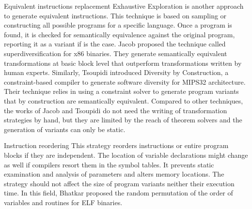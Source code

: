 \begin{strategy}{Equivalent instructions replacement}
    Exhaustive Exploration is another approach to generate equivalent instructions. This technique is based on sampling or constructing all possible programs for a specific language. Once a program is found, it is checked for semantically equivalence against the original program, reporting it as a variant if is the case.
     Jacob \etal \cite{jacob2008superdiversifier} proposed the technique called superdiversification for x86 binaries. They generate semantically equivalent transformations at basic block level that outperform transformations written by human experts. Similarly, Tsoupidi \etal \cite{Tsoupidi2020ConstraintBasedSD} introduced Diversity by Construction, a constraint-based compiler to generate software diversity for MIPS32 architecture. Their technique relies in using a constraint solver to generate program variants that by construction are semantically equivalent. Compared to other techniques, the works of Jacob \etal and Tsoupidi \etal do not need the writing of transformation strategies by hand, but they are limited by the reach of theorem solvers and the generation of variants can only be static. 
\end{strategy}


\begin{strategy}{Instruction reordering}
    \label{strategy:S2}
    \normalfont
    This strategy reorders instructions or entire program blocks if they are independent.
    The location of variable declarations might change as well if compilers resort them in the symbol tables. It prevents static examination and analysis of parameters and alters memory locations. The strategy should not affect the size of program variants neither their execution time. In this field, Bhatkar \etal \cite{bhatkar03, bhatkar2005efficient} proposed the random permutation of the order of variables and routines for ELF binaries.
\end{strategy}

